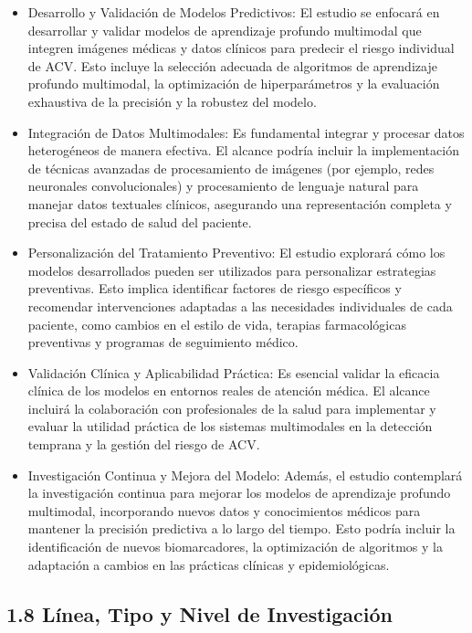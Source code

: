 \begin{itemize}
    \item Desarrollo y Validación de Modelos Predictivos: El estudio se enfocará en desarrollar y validar modelos de aprendizaje profundo multimodal que integren imágenes médicas y datos clínicos para predecir el riesgo individual de ACV. Esto incluye la selección adecuada de algoritmos de aprendizaje profundo multimodal, la optimización de hiperparámetros y la evaluación exhaustiva de la precisión y la robustez del modelo.

    \item Integración de Datos Multimodales: Es fundamental integrar y procesar datos heterogéneos de manera efectiva. El alcance podría incluir la implementación de técnicas avanzadas de procesamiento de imágenes (por ejemplo, redes neuronales convolucionales) y procesamiento de lenguaje natural para manejar datos textuales clínicos, asegurando una representación completa y precisa del estado de salud del paciente.

    \item Personalización del Tratamiento Preventivo: El estudio explorará cómo los modelos desarrollados pueden ser utilizados para personalizar estrategias preventivas. Esto implica identificar factores de riesgo específicos y recomendar intervenciones adaptadas a las necesidades individuales de cada paciente, como cambios en el estilo de vida, terapias farmacológicas preventivas y programas de seguimiento médico.

    \item Validación Clínica y Aplicabilidad Práctica: Es esencial validar la eficacia clínica de los modelos en entornos reales de atención médica. El alcance incluirá la colaboración con profesionales de la salud para implementar y evaluar la utilidad práctica de los sistemas multimodales en la detección temprana y la gestión del riesgo de ACV.

    \item Investigación Continua y Mejora del Modelo: Además, el estudio contemplará la investigación continua para mejorar los modelos de aprendizaje profundo multimodal, incorporando nuevos datos y conocimientos médicos para mantener la precisión predictiva a lo largo del tiempo. Esto podría incluir la identificación de nuevos biomarcadores, la optimización de algoritmos y la adaptación a cambios en las prácticas clínicas y epidemiológicas.
\end{itemize}

\subsection{1.8 Línea, Tipo y Nivel de Investigación}

